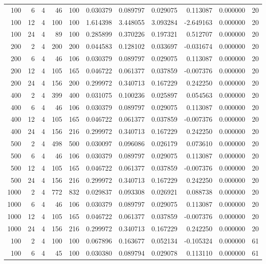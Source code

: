 \begin{table}
\begin{tabular}{rrrrrrrrrrr}
100 & 6 & 4 & 46 & 100 & 0.030379 & 0.089797 & 0.029075 & 0.113087 & 0.000000 & 20 \\
100 & 12 & 4 & 100 & 100 & 1.614398 & 3.448055 & 3.093284 & -2.649163 & 0.000000 & 20 \\
100 & 24 & 4 & 89 & 100 & 0.285899 & 0.370226 & 0.197321 & 0.512707 & 0.000000 & 20 \\
200 & 2 & 4 & 200 & 200 & 0.044583 & 0.128102 & 0.033697 & -0.031674 & 0.000000 & 20 \\
200 & 6 & 4 & 46 & 106 & 0.030379 & 0.089797 & 0.029075 & 0.113087 & 0.000000 & 20 \\
200 & 12 & 4 & 105 & 165 & 0.046722 & 0.061377 & 0.037859 & -0.007376 & 0.000000 & 20 \\
200 & 24 & 4 & 156 & 200 & 0.299972 & 0.340713 & 0.167229 & 0.242250 & 0.000000 & 20 \\
400 & 2 & 4 & 399 & 400 & 0.031075 & 0.100236 & 0.025897 & 0.054563 & 0.000000 & 20 \\
400 & 6 & 4 & 46 & 106 & 0.030379 & 0.089797 & 0.029075 & 0.113087 & 0.000000 & 20 \\
400 & 12 & 4 & 105 & 165 & 0.046722 & 0.061377 & 0.037859 & -0.007376 & 0.000000 & 20 \\
400 & 24 & 4 & 156 & 216 & 0.299972 & 0.340713 & 0.167229 & 0.242250 & 0.000000 & 20 \\
500 & 2 & 4 & 498 & 500 & 0.030097 & 0.096086 & 0.026179 & 0.073610 & 0.000000 & 20 \\
500 & 6 & 4 & 46 & 106 & 0.030379 & 0.089797 & 0.029075 & 0.113087 & 0.000000 & 20 \\
500 & 12 & 4 & 105 & 165 & 0.046722 & 0.061377 & 0.037859 & -0.007376 & 0.000000 & 20 \\
500 & 24 & 4 & 156 & 216 & 0.299972 & 0.340713 & 0.167229 & 0.242250 & 0.000000 & 20 \\
1000 & 2 & 4 & 772 & 832 & 0.029837 & 0.093308 & 0.026921 & 0.088738 & 0.000000 & 20 \\
1000 & 6 & 4 & 46 & 106 & 0.030379 & 0.089797 & 0.029075 & 0.113087 & 0.000000 & 20 \\
1000 & 12 & 4 & 105 & 165 & 0.046722 & 0.061377 & 0.037859 & -0.007376 & 0.000000 & 20 \\
1000 & 24 & 4 & 156 & 216 & 0.299972 & 0.340713 & 0.167229 & 0.242250 & 0.000000 & 20 \\
100 & 2 & 4 & 100 & 100 & 0.067896 & 0.163677 & 0.052134 & -0.105324 & 0.000000 & 61 \\
100 & 6 & 4 & 45 & 100 & 0.030380 & 0.089794 & 0.029078 & 0.113110 & 0.000000 & 61 \\

\end{tabular}
\end{table}

